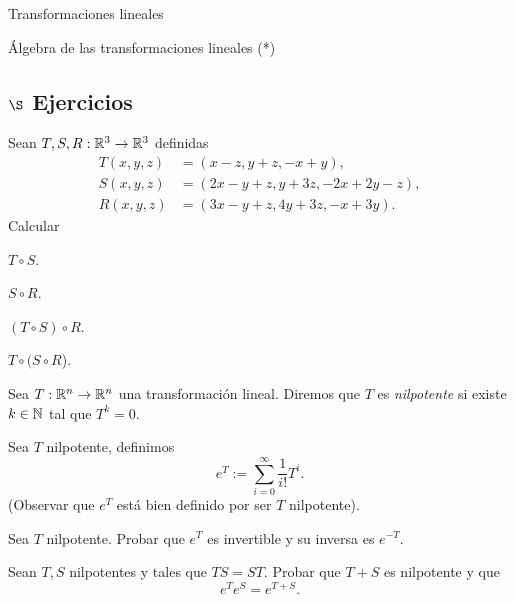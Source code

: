 \begin{chapter}{Transformaciones lineales}
\begin{section}{\'Algebra de las transformaciones lineales (*)}
        \subsection*{$\S$ Ejercicios}

        \begin{enumex}
            \item Sean $T,S, R: \mathbb R^3 \to \mathbb R^3$ definidas
            \begin{align*}
                T(x,y,z) &= (x-z, y+z, -x+y), \\
                S(x,y,z) &= (2x-y+z, y+3z, -2x+2y-z), \\
                R(x,y,z) &= (3x-y+z, 4y+3z, -x+3y).
            \end{align*}
            Calcular
            \begin{multicols}{4}
                \begin{enumex}
                    \item $T \circ S$.
                    \item $S \circ R$.
                    \item $(T \circ S) \circ R$.
                    \item $T \circ( S\circ R$).
                \end{enumex}
            \end{multicols}
            \item Sea $T: \mathbb R^n \to \mathbb R^n$ una transformación lineal. Diremos que $T$ es \textit{nilpotente} si existe $k \in \mathbb N$ tal que $T^k =0$. 
            
            Sea $T$ nilpotente, definimos
            $$
            e^T := \sum_{i=0}^\infty \frac1{i!}T^i.
            $$
            (Observar que $e^T$ está bien definido por ser $T$ nilpotente). 
            \begin{enumex}
                \item Sea $T$ nilpotente. Probar que $e^T$ es invertible y su inversa es $e^{-T}$. 
                \item Sean $T, S$ nilpotentes y tales que $TS=ST$. Probar que $T+S$ es nilpotente y que
                $$
                e^{T}e^{S}= e^{T+S}.
                $$
            \end{enumex}
            
        \end{enumex}

        \end{section}





\end{chapter}
